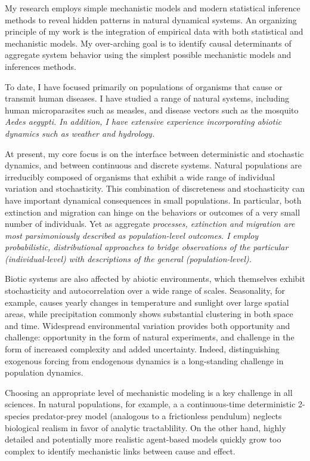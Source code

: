 \documentclass[12pt]{article}
\author{Christian Gunning}
\title{}
\date{\today}
\begin{document}
My research employs simple mechanistic models and modern statistical inference 
methods to reveal hidden patterns in natural dynamical systems.
An organizing principle of my work is the integration of empirical 
data with both statistical and mechanistic models.
My over-arching goal is to identify causal determinants of aggregate 
system behavior using the simplest possible mechanistic models and 
inferences methods. 

To date, I have focused primarily on populations
of organisms that cause or transmit human diseases.
I have studied a range of natural systems, 
including human microparasites such as measles,
and disease vectors such as the mosquito 
\em{Aedes aegypti}.  In addition, I have extensive 
experience incorporating abiotic dynamics such as weather
and hydrology.


At present, my core focus is on the interface 
between deterministic and stochastic dynamics, 
and between continuous and discrete systems.
Natural populations are irreducibly composed of 
organisms that exhibit a wide range of individual variation 
and stochasticity.  This combination of discreteness and 
stochasticity can have important dynamical consequences in
small populations. In particular, both extinction and migration
can hinge on the behaviors or outcomes of a very small
number of individuals.
Yet as aggregate \em{processes}, extinction and migration 
are most parsimoniously described as population-level 
outcomes. I employ
probabilistic, distributional approaches to bridge 
observations of the particular (individual-level) with 
descriptions of the general (population-level).

Biotic systems are also affected by 
abiotic environments, which themselves
exhibit stochasticity and 
autocorrelation over a wide range of scales.
Seasonality, for example, causes 
yearly changes in temperature and sunlight
over large spatial areas, while precipitation 
commonly shows substantial clustering in 
both space and time.  
Widespread environmental variation provides both
opportunity and challenge: opportunity in the form
of natural experiments, and challenge in the form
of increased complexity and added uncertainty.  
Indeed, distinguishing exogenous forcing from 
endogenous dynamics is a long-standing challenge 
in population dynamics.

Choosing an appropriate level of mechanistic modeling is a key 
challenge in all sciences.  In natural populations, for example, a
a continuous-time deterministic
2-species predator-prey model (analogous to a frictionless pendulum) 
neglects biological realism in favor of 
analytic tractablility.  On the other hand, highly detailed 
and potentially more realistic agent-based models
quickly grow too complex to identify mechanistic links 
between cause and effect.  
\end{document}
